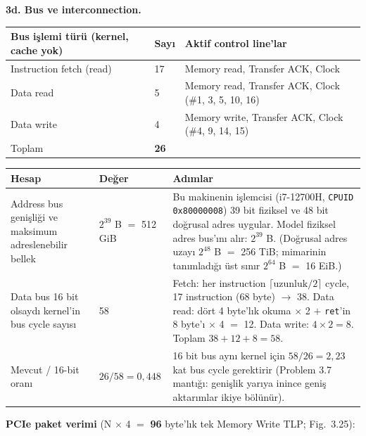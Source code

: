 \documentclass[11pt,a4paper]{article}
\newcommand{\tl}{\texttt}
\newcommand{\hd}[1]{\cellcolor{hdr}#1}
\begin{document}
\textbf{3d. Bus ve interconnection.}

\begin{longtable}{|p{6.2cm}|p{1.4cm}|p{7.9cm}|}
\hline
\hd{Bus işlemi türü (kernel, cache yok)} & \hd{Sayı} & \hd{Aktif control line'lar}\\
\hline
Instruction fetch (read) & 17 & Memory read, Transfer ACK, Clock\\ \hline
Data read & 5 & Memory read, Transfer ACK, Clock (\#1, 3, 5, 10, 16)\\ \hline
Data write & 4 & Memory write, Transfer ACK, Clock (\#4, 9, 14, 15)\\ \hline
Toplam & \textbf{26} & \\ \hline
\end{longtable}

\begin{longtable}{|p{5.0cm}|p{2.4cm}|p{8.1cm}|}
\hline
\hd{Hesap} & \hd{Değer} & \hd{Adımlar}\\
\hline
\endhead
Address bus genişliği ve maksimum adreslenebilir bellek & $2^{39}$ B $=$ 512 GiB & Bu makinenin işlemcisi (i7-12700H, \tl{CPUID 0x80000008}) 39 bit fiziksel ve 48 bit doğrusal adres uygular. Model fiziksel adres bus'ını alır: $2^{39}$ B. (Doğrusal adres uzayı $2^{48}$ B $=$ 256 TiB; mimarinin tanımladığı üst sınır $2^{64}$ B $=$ 16 EiB.)\\ \hline
Data bus 16 bit olsaydı kernel'in bus cycle sayısı & 58 & Fetch: her instruction $\lceil \text{uzunluk}/2 \rceil$ cycle, 17 instruction (68 byte) $\to$ 38. Data read: dört 4 byte'lık okuma $\times$ 2 $+$ \tl{ret}'in 8 byte'ı $\times$ 4 $=$ 12. Data write: $4 \times 2 = 8$. Toplam $38 + 12 + 8 = 58$.\\ \hline
Mevcut / 16-bit oranı & $26/58 = 0{,}448$ & 16 bit bus aynı kernel için $58/26 = 2{,}23$ kat bus cycle gerektirir (Problem 3.7 mantığı: genişlik yarıya inince geniş aktarımlar ikiye bölünür).\\ \hline
\end{longtable}

\textbf{PCIe paket verimi} (N $\times$ 4 $=$ \textbf{96} byte'lık tek Memory Write TLP; Fig.~3.25):
\end{document}
